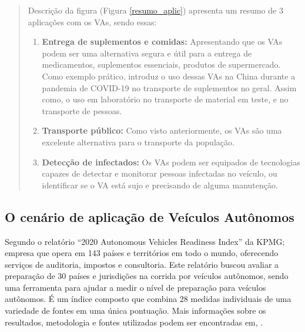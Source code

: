 \begin{quote}

Descrição da figura (Figura \ref{resumo_aplic}) apresenta um resumo de 3 aplicações com os VAs, sendo essas:

\begin{enumerate}
 \item \textbf{Entrega de suplementos e comidas:} Apresentando que os VAs podem ser uma alternativa segura e útil para a entrega de medicamentos, suplementos essenciais, produtos de supermercado. Como exemplo prático, introduz o uso dessas VAs na China durante a pandemia de COVID-19 no transporte de suplementos no geral. Assim como, o uso em laboratório no transporte de material em teste, e no transporte de pessoas.

\item \textbf{Transporte público:} Como visto anteriormente, os VAs são uma excelente alternativa para o transporte da população. 

\item \textbf{Detecção de infectados:} Os VAs podem ser equipados de tecnologias capazes de detectar e monitorar pessoas infectadas no veículo, ou identificar se o VA está sujo e precisando de alguma manutenção. 

\end{enumerate}

\end{quote}

\subsection{O cenário de aplicação de Veículos Autônomos}
Segundo o relatório “2020 Autonomous Vehicles Readiness Index” da KPMG; empresa que opera em 143 países e territórios em todo o mundo, oferecendo serviços de auditoria, impostos e consultoria. Este relatório buscou avaliar a preparação de 30 países e jurisdições na corrida por veículos autônomos, sendo uma ferramenta para ajudar a medir o nível de preparação para veículos autônomos. É um índice composto que combina 28 medidas individuais de uma variedade de fontes em uma única pontuação. Mais informações sobre os resultados, metodologia e fontes utilizadas podem ser encontradas em, \cite{KPMG}.

